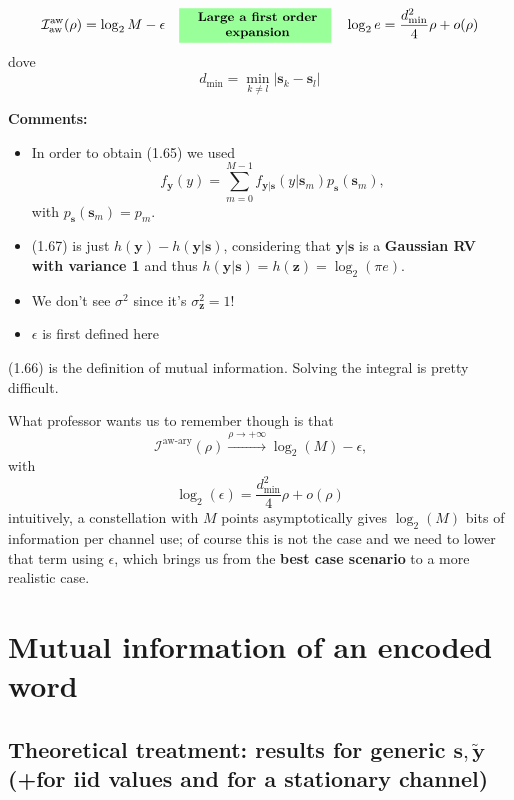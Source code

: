 \documentclass[a4paper, 11pt]{book}
\begin{document}
$$
\mathcal{I}^{\text{aw}}_{\text{aw}}(\rho) = \log_2 M - \epsilon
\quad
\colorbox{green!40}{
\begin{minipage}{3.5cm}
\centering
\small \textbf{Large a first order expansion}
\end{minipage}}
\quad
\log_2 e = \frac{d^2_{\min}}{4} \rho + o(\rho)
$$
dove
$$
d_{\min} = \min_{k \neq l} |\bm{s}_k - \bm{s}_l|
$$

\vspace{1em}
\textbf{Comments:}
\begin{itemize}
    \item In order to obtain (1.65) we used
    $$
    f_{\bm{y}}(y) = \sum_{m=0}^{M-1} f_{\bm{y}| \bm{s}}(y | \bm{s}_m) p_{\bm{s}}(\bm{s}_m)\text{,}
    $$
    with $p_{\bm{s}}(\bm{s}_m) = p_m$.
    \item (1.67) is just $h(\bm{y}) - h(\bm{y}|\bm{s})$, considering that $\bm{y}|\bm{s}$ is a \textbf{Gaussian RV with variance 1} and thus $h(\bm{y}|\bm{s}) = h(\bm{z}) = \log_2(\pi e)$.
    \item We don't see $\sigma^2$ since it's $\sigma^2_{\bm{z}} = 1$!
    \item $\epsilon$ is first defined here
\end{itemize}

(1.66) is the definition of mutual information. Solving the integral is pretty difficult.

What professor wants us to remember though is that
$$
\mathcal{I}^{\text{aw-ary}}(\rho) \xrightarrow{\rho \to +\infty} \log_2(M) - \epsilon\text{,}
$$
with
$$
\log_2(\epsilon) = \frac{d^2_{\min}}{4} \rho + o(\rho)
$$
intuitively, a constellation with $M$ points asymptotically gives $\log_2(M)$ bits of information per channel use; of course this is not the case and we need to lower that term using $\epsilon$, which brings us from the \textbf{best case scenario} to a more realistic case.

\section{Mutual information of an encoded word}

\subsection{\texorpdfstring{Theoretical treatment: results for generic $\bm{s}, \bm{\tilde{y}}$ (+for iid values and for a stationary channel)}{Theoretical treatment: results for generic s, y (for iid values and for a stationary channel)}}
\end{document}
